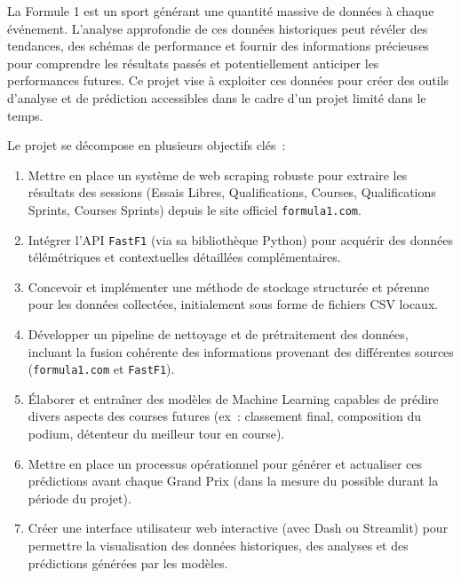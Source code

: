 \documentclass[11pt, a4paper]{article}
\begin{document}
\begin{description}[style=standard, itemsep=0.5em, labelwidth=!, leftmargin=1.5em, font=\normalfont] %
    \item[Contexte~:] La Formule 1 est un sport générant une quantité massive de données à chaque événement. L'analyse approfondie de ces données historiques peut révéler des tendances, des schémas de performance et fournir des informations précieuses pour comprendre les résultats passés et potentiellement anticiper les performances futures. Ce projet vise à exploiter ces données pour créer des outils d'analyse et de prédiction accessibles dans le cadre d'un projet limité dans le temps.

    \item[Objectifs spécifiques~:] Le projet se décompose en plusieurs objectifs clés~:
    \begin{enumerate}[label=\arabic*.~, wide, labelwidth=!, labelindent=0pt, leftmargin=*] %
        \item Mettre en place un système de web scraping robuste pour extraire les résultats des sessions (Essais Libres, Qualifications, Courses, Qualifications Sprints, Courses Sprints) depuis le site officiel \texttt{formula1.com}.
        \item Intégrer l'API \texttt{FastF1} (via sa bibliothèque Python) pour acquérir des données télémétriques et contextuelles détaillées complémentaires.
        \item Concevoir et implémenter une méthode de stockage structurée et pérenne pour les données collectées, initialement sous forme de fichiers CSV locaux.
        \item Développer un pipeline de nettoyage et de prétraitement des données, incluant la fusion cohérente des informations provenant des différentes sources (\texttt{formula1.com} et \texttt{FastF1}).
        \item Élaborer et entraîner des modèles de Machine Learning capables de prédire divers aspects des courses futures (ex~: classement final, composition du podium, détenteur du meilleur tour en course).
        \item Mettre en place un processus opérationnel pour générer et actualiser ces prédictions avant chaque Grand Prix (dans la mesure du possible durant la période du projet).
        \item Créer une interface utilisateur web interactive (avec Dash ou Streamlit) pour permettre la visualisation des données historiques, des analyses et des prédictions générées par les modèles.
    \end{enumerate}
\end{description}
\end{document}
